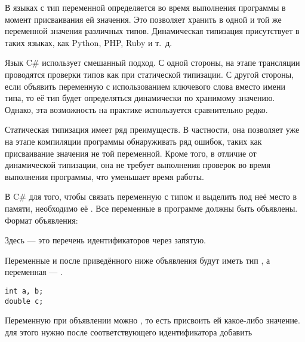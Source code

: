 В языках с  тип
переменной определяется во время выполнения программы в момент
присваивания ей значения. Это позволяет хранить в одной и той же
переменной значения различных типов.  Динамическая типизация
присутствует в таких языках, как Python, PHP, Ruby и т.~д.

Язык C\# использует смешанный подход. С одной стороны, на этапе
трансляции проводятся проверки типов как при статической типизации. С
другой стороны, если объявить переменную с использованием ключевого
слова  вместо имени типа, то её тип будет определяться
динамически по хранимому значению. Однако, эта возможность на практике
используется сравнительно редко.

Статическая типизация имеет ряд преимуществ. В частности, она
позволяет уже на этапе компиляции программы обнаруживать ряд ошибок,
таких как присваивание значения не той переменной. Кроме того, в
отличие от динамической типизации, она не требует выполнения проверок
во время выполнения программы, что уменьшает время работы.


В C\# для того, чтобы связать переменную с типом и выделить под неё
место в памяти, необходимо её
. Все переменные в программе
должны быть объявлены. Формат объявления:

\begin{center}
  \par
\end{center}

Здесь  — это перечень
идентификаторов через запятую.

\begin{example}
  Переменные  и  после приведённого ниже
  объявления будут иметь тип , а переменная  —
  .

\begin{lstlisting}
int a, b;
double c;
\end{lstlisting}
\end{example}


Переменную при объявлении можно
, то есть присвоить ей
какое-либо значение. для этого нужно после соответствующего
идентификатора добавить

\begin{center}
  \par
\end{center}

